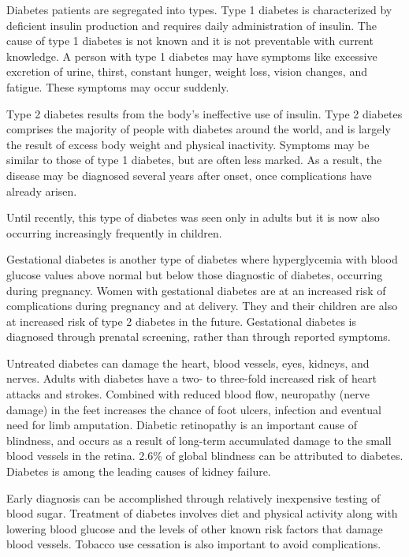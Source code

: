\documentclass[12pt]{article}
\begin{document}
Diabetes patients are segregated into types. Type 1 diabetes is characterized by deficient insulin production and requires daily administration of insulin. The cause of type 1 diabetes is not known and it is not preventable with current knowledge. A person with type 1 diabetes may have symptoms like excessive excretion of urine, thirst, constant hunger, weight loss, vision changes, and fatigue. These symptoms may occur suddenly.

Type 2 diabetes results from the body’s ineffective use of insulin. Type 2 diabetes comprises the majority of people with diabetes around the world, and is largely the result of excess body weight and physical inactivity. Symptoms may be similar to those of type 1 diabetes, but are often less marked. As a result, the disease may be diagnosed several years after onset, once complications have already arisen.

Until recently, this type of diabetes was seen only in adults but it is now also occurring increasingly frequently in children.

Gestational diabetes is another type of diabetes where hyperglycemia with blood glucose values above normal but below those diagnostic of diabetes, occurring during pregnancy. Women with gestational diabetes are at an increased risk of complications during pregnancy and at delivery. They and their children are also at increased risk of type 2 diabetes in the future. Gestational diabetes is diagnosed through prenatal screening, rather than through reported symptoms.

Untreated diabetes can damage the heart, blood vessels, eyes, kidneys, and nerves. Adults with diabetes have a two- to three-fold increased risk of heart attacks and strokes. Combined with reduced blood flow, neuropathy (nerve damage) in the feet increases the chance of foot ulcers, infection and eventual need for limb amputation. Diabetic retinopathy is an important cause of blindness, and occurs as a result of long-term accumulated damage to the small blood vessels in the retina. 2.6\% of global blindness can be attributed to diabetes. Diabetes is among the leading causes of kidney failure.

Early diagnosis can be accomplished through relatively inexpensive testing of blood sugar. Treatment of diabetes involves diet and physical activity along with lowering blood glucose and the levels of other known risk factors that damage blood vessels. Tobacco use cessation is also important to avoid complications. \cite{alberti_zimmet_2004}\cite{internationaldiabetesfederation}
\end{document}
